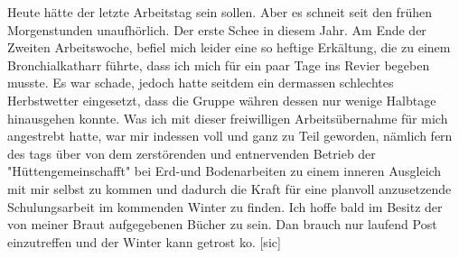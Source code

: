 \def\day{29.9.1942 *}
\mktitle

Heute h\"{a}tte der letzte Arbeitstag sein sollen.
Aber es schneit seit den fr\"{u}hen Morgenstunden unaufh\"{o}rlich.
Der erste Schee in diesem Jahr.
Am Ende der Zweiten Arbeitswoche, befiel mich leider eine so heftige Erk\"{a}ltung, die zu einem Bronchialkatharr f\"{u}hrte, dass ich mich f\"{u}r ein paar Tage ins Revier begeben musste.
Es war schade, jedoch hatte seitdem ein dermassen schlechtes Herbstwetter eingesetzt, dass die Gruppe w\"{a}hren dessen nur wenige Halbtage hinausgehen konnte.
Was ich mit dieser freiwilligen Arbeits\"{u}bernahme f\"{u}r mich angestrebt hatte, war mir indessen voll und ganz zu Teil geworden, n\"{a}mlich fern des tags \"{u}ber von dem zerst\"{o}renden und entnervenden Betrieb der "H\"{u}ttengemeinschafft" bei Erd-und Bodenarbeiten zu einem inneren Ausgleich mit mir selbst zu kommen und dadurch die Kraft f\"{u}r eine planvoll anzusetzende Schulungsarbeit im kommenden Winter zu finden.
Ich hoffe bald im Besitz der von meiner Braut aufgegebenen B\"{u}cher zu sein.
Dan brauch nur laufend Post einzutreffen und der Winter kann getrost ko.{\color{red} [sic] }

\clearpage
